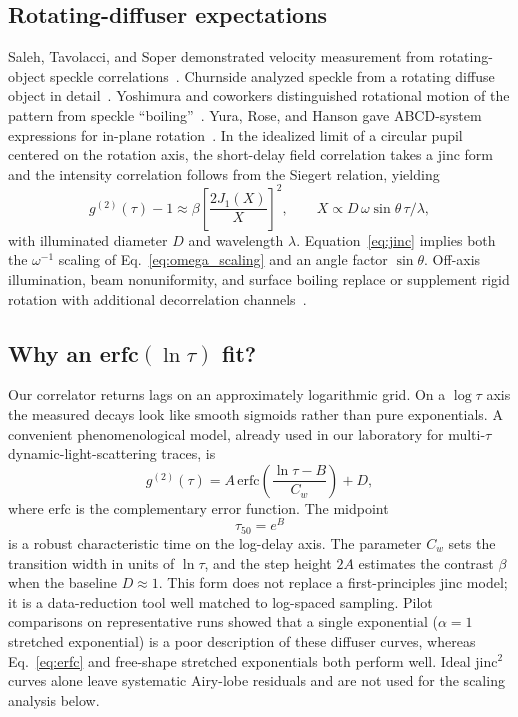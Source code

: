 \documentclass[11pt,letterpaper]{article}
\newcommand{\gtt}{g^{(2)}}
\begin{document}
\subsection{Rotating-diffuser expectations}

Saleh, Tavolacci, and Soper demonstrated velocity measurement from
rotating-object speckle correlations~\cite{Saleh1975}. Churnside analyzed
speckle from a rotating diffuse object in detail~\cite{Churnside1982}.
Yoshimura and coworkers distinguished rotational motion of the pattern from
speckle ``boiling''~\cite{Yoshimura1986}. Yura, Rose, and Hanson gave ABCD-system
expressions for in-plane rotation~\cite{Yura1998}. In the idealized limit of a
circular pupil centered on the rotation axis, the short-delay field correlation
takes a jinc form and the intensity correlation follows from the Siegert
relation, yielding
\begin{equation}
  \gtt(\tau)-1
  \approx
  \beta
  \left[
    \frac{2J_1(X)}{X}
  \right]^2,
  \qquad
  X
  \propto
  D\,\omega\sin\theta\,\tau/\lambda,
  \label{eq:jinc}
\end{equation}
with illuminated diameter $D$ and wavelength $\lambda$. Equation~\eqref{eq:jinc}
implies both the $\omega^{-1}$ scaling of Eq.~\eqref{eq:omega_scaling} and an
angle factor $\sin\theta$. Off-axis illumination, beam nonuniformity, and
surface boiling replace or supplement rigid rotation with additional
decorrelation channels~\cite{Yoshimura1986,Yura1998}.

\subsection{Why an erfc$(\ln\tau)$ fit?}

Our correlator returns lags on an approximately logarithmic grid. On a
$\log\tau$ axis the measured decays look like smooth sigmoids rather than pure
exponentials. A convenient phenomenological model, already used in our laboratory
for multi-$\tau$ dynamic-light-scattering traces, is
\begin{equation}
  \gtt(\tau)
  =
  A\,\mathrm{erfc}\!
  \left(
    \frac{\ln\tau-B}{C_w}
  \right)
  +
  D,
  \label{eq:erfc}
\end{equation}
where $\mathrm{erfc}$ is the complementary error function. The midpoint
\begin{equation}
  \tau_{50}=e^{B}
\end{equation}
is a robust characteristic time on the log-delay axis. The parameter $C_w$ sets
the transition width in units of $\ln\tau$, and the step height $2A$ estimates
the contrast $\beta$ when the baseline $D\approx 1$. This form does not replace
a first-principles jinc model; it is a data-reduction tool well matched to
log-spaced sampling. Pilot comparisons on representative runs showed that a
single exponential ($\alpha=1$ stretched exponential) is a poor description of
these diffuser curves, whereas Eq.~\eqref{eq:erfc} and free-shape stretched
exponentials both perform well. Ideal jinc$^2$ curves alone leave systematic
Airy-lobe residuals and are not used for the scaling analysis below.
\end{document}
